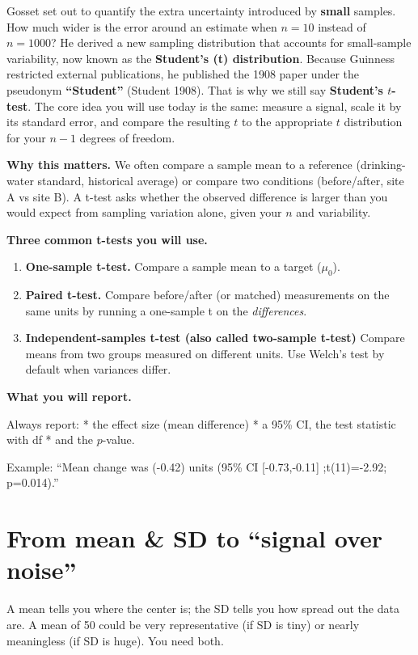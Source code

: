 \documentclass[
  letterpaper,
  DIV=11,
  numbers=noendperiod]{scrreprt}
\providecommand{\tightlist}{%
  \setlength{\itemsep}{0pt}\setlength{\parskip}{0pt}}
\begin{document}
Gosset set out to quantify the extra uncertainty introduced by
\textbf{small} samples. How much wider is the error around an estimate
when \(n=10\) instead of \(n=1000\)? He derived a new sampling
distribution that accounts for small-sample variability, now known as
the \textbf{Student's (t) distribution}. Because Guinness restricted
external publications, he published the 1908 paper under the pseudonym
\textbf{``Student''} (Student 1908). That is why we still say
\textbf{Student's \(t\)-test}. The core idea you will use today is the
same: measure a signal, scale it by its standard error, and compare the
resulting \(t\) to the appropriate \(t\) distribution for your \(n-1\)
degrees of freedom.

\textbf{Why this matters.} We often compare a sample mean to a reference
(drinking-water standard, historical average) or compare two conditions
(before/after, site A vs site B). A t-test asks whether the observed
difference is larger than you would expect from sampling variation
alone, given your \(n\) and variability.

\textbf{Three common t-tests you will use.}

\begin{enumerate}
\def\labelenumi{\arabic{enumi}.}
\tightlist
\item
  \textbf{One-sample t-test.} Compare a sample mean to a target
  (\(\mu_0\)).
\item
  \textbf{Paired t-test.} Compare before/after (or matched) measurements
  on the same units by running a one-sample t on the \emph{differences}.
\item
  \textbf{Independent-samples t-test (also called two-sample t-test)}
  Compare means from two groups measured on different units. Use Welch's
  test by default when variances differ.
\end{enumerate}

\textbf{What you will report.}

Always report: * the effect size (mean difference) * a 95\% CI, the test
statistic with df * and the \(p\)-value.

Example: ``Mean change was (-0.42) units (95\% CI {[}-0.73,-0.11{]}
;t(11)=-2.92; p=0.014).''

\section{From mean \& SD to ``signal over
noise''}\label{from-mean-sd-to-signal-over-noise}

A mean tells you where the center is; the SD tells you how spread out
the data are. A mean of 50 could be very representative (if SD is tiny)
or nearly meaningless (if SD is huge). You need both.
\end{document}
